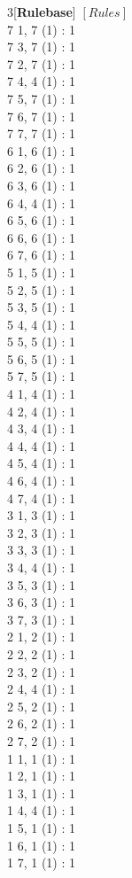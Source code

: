 \begin{multicols}{3}[\textbf{Rulebase}]
$ [Rules] $\\
7 1, 7 (1) : 1\\
7 3, 7 (1) : 1\\
7 2, 7 (1) : 1\\
7 4, 4 (1) : 1\\
7 5, 7 (1) : 1\\
7 6, 7 (1) : 1\\
7 7, 7 (1) : 1\\
6 1, 6 (1) : 1\\
6 2, 6 (1) : 1\\
6 3, 6 (1) : 1\\
6 4, 4 (1) : 1\\
6 5, 6 (1) : 1\\
6 6, 6 (1) : 1\\
6 7, 6 (1) : 1\\
5 1, 5 (1) : 1\\
5 2, 5 (1) : 1\\
5 3, 5 (1) : 1\\
5 4, 4 (1) : 1\\
5 5, 5 (1) : 1\\
5 6, 5 (1) : 1\\
5 7, 5 (1) : 1\\
4 1, 4 (1) : 1\\
4 2, 4 (1) : 1\\
4 3, 4 (1) : 1\\
4 4, 4 (1) : 1\\
4 5, 4 (1) : 1\\
4 6, 4 (1) : 1\\
4 7, 4 (1) : 1\\
3 1, 3 (1) : 1\\
3 2, 3 (1) : 1\\
3 3, 3 (1) : 1\\
3 4, 4 (1) : 1\\
3 5, 3 (1) : 1\\
3 6, 3 (1) : 1\\
3 7, 3 (1) : 1\\
2 1, 2 (1) : 1\\
2 2, 2 (1) : 1\\
2 3, 2 (1) : 1\\
2 4, 4 (1) : 1\\
2 5, 2 (1) : 1\\
2 6, 2 (1) : 1\\
2 7, 2 (1) : 1\\
1 1, 1 (1) : 1\\
1 2, 1 (1) : 1\\
1 3, 1 (1) : 1\\
1 4, 4 (1) : 1\\
1 5, 1 (1) : 1\\
1 6, 1 (1) : 1\\
1 7, 1 (1) : 1
 
\end{multicols}

